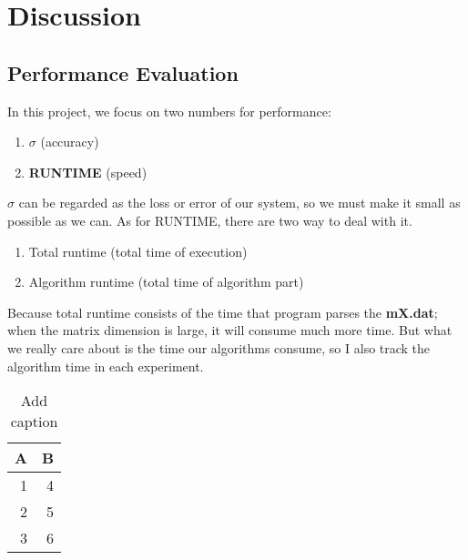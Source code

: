 \documentclass{article}
\begin{document}
\section{Discussion}
\subsection{Performance Evaluation}
In this project, we focus on two numbers for performance:
\begin{enumerate}
    \item \boldmath$\sigma$ (accuracy) \\
    \item \textbf{RUNTIME} (speed)
\end{enumerate}

$\sigma$ can be regarded as the loss or error of our system, so we must make it small as possible as we can. As for RUNTIME, there are
two way to deal with it.
\begin{enumerate}
    \item Total runtime (total time of execution) \\
    \item Algorithm runtime (total time of algorithm part)
\end{enumerate}
Because total runtime consists of the time that program parses the \textbf{mX.dat}; when the matrix dimension is large, it will consume
much more time. But what we really care about is the time our algorithms consume, so I also track the algorithm time in each 
experiment.






\begin{table}[htbp]
  \centering
  \caption{Add caption}
    \begin{tabular}{|r|r|}
    \hline
    \multicolumn{1}{|l|}{A} & \multicolumn{1}{l|}{B} \bigstrut\\
    \hline
    1   & 4 \bigstrut\\
    \hline
    2   & 5 \bigstrut\\
    \hline
    3   & 6 \bigstrut\\
    \hline
    \end{tabular}%
  \label{tab:addlabel}%
\end{table}%


\end{document}
